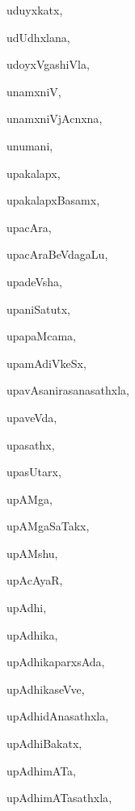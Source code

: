 \begin{multicols}{3}
{\noindent
{uduyxkatx}, \pageref{uduyxkatx}

\noindent
{udUdhxlana}, \pageref{udUdhxlana}

\noindent
{udoyxVgashiVla}, \pageref{udoyxVgashiVla}

\noindent
{unamxniV}, \pageref{unamxniV}

\noindent
{unamxniVjAcnxna}, \pageref{unamxniVjAcnxna}

\noindent
{unumani}, \pageref{unumani}

\noindent
{upakalapx}, \pageref{upakalapx}

\noindent
{upakalapxBasamx}, \pageref{upakalapxBasamx}

\noindent
{upacAra}, \pageref{upacAra}

\noindent
{upacAraBeVdagaLu}, \pageref{upacAraBeVdagaLu}

\noindent
{upadeVsha}, \pageref{upadeVsha}

\noindent
{upaniSatutx}, \pageref{upaniSatutx}

\noindent
{upapaMcama}, \pageref{upapaMcama}

\noindent
{upamAdiVkeSx}, \pageref{upamAdiVkeSx}

\noindent
{upavAsanirasanasathxla}, \pageref{upavAsanirasanasathxla}

\noindent
{upaveVda}, \pageref{upaveVda}

\noindent
{upasathx}, \pageref{upasathx}

\noindent
{upasUtarx}, \pageref{upasUtarx}

\noindent
{upAMga}, \pageref{upAMga}

\noindent
{upAMgaSaTakx}, \pageref{upAMgaSaTakx}

\noindent
{upAMshu}, \pageref{upAMshu}

\noindent
{upAcAyaR}, \pageref{upAcAyaR}

\noindent
{upAdhi}, \pageref{upAdhi}

\noindent
{upAdhika}, \pageref{upAdhika}

\noindent
{upAdhikaparxsAda}, \pageref{upAdhikaparxsAda}

\noindent
{upAdhikaseVve}, \pageref{upAdhikaseVve}

\noindent
{upAdhidAnasathxla}, \pageref{upAdhidAnasathxla}

\noindent
{upAdhiBakatx}, \pageref{upAdhiBakatx}

\noindent
{upAdhimATa}, \pageref{upAdhimATa}

\noindent
{upAdhimATasathxla}, \pageref{upAdhimATasathxla}

}
\end{multicols}
